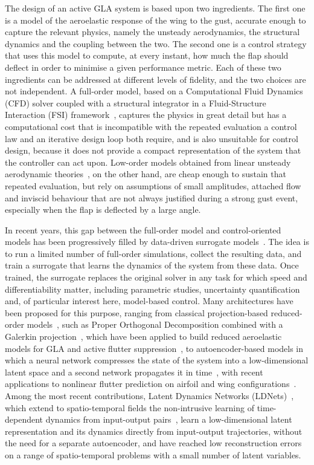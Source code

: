 The design of an active GLA system is based upon two ingredients. The first one is a model of the aeroelastic response of the wing to the gust, accurate enough to capture the relevant physics, namely the unsteady aerodynamics, the structural dynamics and the coupling between the two. The second one is a control strategy that uses this model to compute, at every instant, how much the flap should deflect in order to minimise a given performance metric. Each of these two ingredients can be addressed at different levels of fidelity, and the two choices are not independent. A full-order model, based on a Computational Fluid Dynamics (CFD) solver coupled with a structural integrator in a Fluid-Structure Interaction (FSI) framework~\cite{bazilevs2013csfi}, captures the physics in great detail but has a computational cost that is incompatible with the repeated evaluation a control law and an iterative design loop both require, and is also unsuitable for control design, because it does not provide a compact representation of the system that the controller can act upon. Low-order models obtained from linear unsteady aerodynamic theories~\cite{Theodorsen,hoblit1988gust}, on the other hand, are cheap enough to sustain that repeated evaluation, but rely on assumptions of small amplitudes, attached flow and inviscid behaviour that are not always justified during a strong gust event, especially when the flap is deflected by a large angle.

In recent years, this gap between the full-order model and control-oriented models has been progressively filled by data-driven surrogate models~\cite{brunton2020ml}. The idea is to run a limited number of full-order simulations, collect the resulting data, and train a surrogate that learns the dynamics of the system from these data. Once trained, the surrogate replaces the original solver in any task for which speed and differentiability matter, including parametric studies, uncertainty quantification and, of particular interest here, model-based control. Many architectures have been proposed for this purpose, ranging from classical projection-based reduced-order models~\cite{BennerGugercinWillcox2015}, such as Proper Orthogonal Decomposition combined with a Galerkin projection~\cite{QuarteroniManzoniNegri2016}, which have been applied to build reduced aeroelastic models for GLA and active flutter suppression~\cite{ZhangChenYe2014,BertolinEtAl2018}, to autoencoder-based models in which a neural network compresses the state of the system into a low-dimensional latent space and a second network propagates it in time~\cite{LeeCarlberg2020,FrescaDedeManzoni2021}, with recent applications to nonlinear flutter prediction on airfoil and wing configurations~\cite{MogharabinEpureanuGhadami2025,WangEtAl2025}. Among the most recent contributions, Latent Dynamics Networks (LDNets)~\cite{Regazzoni}, which extend to spatio-temporal fields the non-intrusive learning of time-dependent dynamics from input-output pairs~\cite{RegazzoniDedeQuarteroni2019}, learn a low-dimensional latent representation and its dynamics directly from input-output trajectories, without the need for a separate autoencoder, and have reached low reconstruction errors on a range of spatio-temporal problems with a small number of latent variables.

